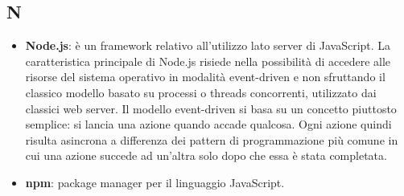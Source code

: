 \subsection{N}
\begin{itemize}
	\item
	\textbf{Node.js}: è un framework relativo all'utilizzo lato server di JavaScript.
	 La caratteristica principale di Node.js risiede nella possibilità di accedere alle risorse del sistema operativo in modalità event-driven e non sfruttando il classico modello basato su processi o threads concorrenti, utilizzato dai classici web server. Il modello event-driven si basa su un concetto piuttosto semplice: si lancia una azione quando accade qualcosa. Ogni azione quindi risulta asincrona a differenza dei pattern di programmazione più comune in cui una azione succede ad un'altra solo dopo che essa è stata completata.
	 \item
	 \textbf{npm}: package manager per il linguaggio JavaScript.
\end{itemize}